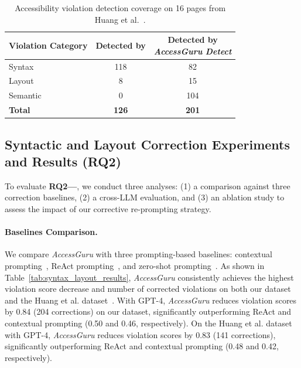 \documentclass[sigconf, nonacm]{acmart}
\newcommand{\method}{\emph{AccessGuru}}
\begin{document}

\renewcommand{\arraystretch}{1.2}
\begin{table}[h]
\centering
\caption{Accessibility violation detection coverage on 16 pages from Huang et al.~\cite{DBLP:journals/corr/abs-2401-16450}.}
\label{tab:detection_coverage}
\small
\begin{tabular}{|l|c|c|}
\hline
\textbf{Violation Category} & \makecell{\textbf{Detected by} \\ \textbf{\cite{DBLP:journals/corr/abs-2401-16450}}} & \makecell{\textbf{Detected by} \\ \textbf{\method{} \emph{Detect}}} \\
\hline
Syntax    & 118 & 82  \\
Layout    & 8   & 15  \\
Semantic  & 0   & 104 \\
\hline
\textbf{Total} & \textbf{126} & \textbf{201} \\
\hline
\end{tabular}
\renewcommand{\arraystretch}{1.0}
\end{table}

\subsection{Syntactic and Layout Correction Experiments and Results (RQ2)}

To evaluate \textbf{RQ2—}, we conduct three analyses: (1) a comparison against three correction baselines, (2) a cross-LLM evaluation, and (3) an ablation study to assess the impact of our corrective re-prompting strategy.

\paragraph{Baselines Comparison.} We compare \method{} with three prompting-based baselines: contextual prompting~\cite{DBLP:conf/petra/OthmanDJ23}, ReAct prompting~\cite{DBLP:journals/corr/abs-2401-16450}, and zero-shot prompting~\cite{DBLP:conf/ccnc/DelnevoAM24}. As shown in Table~\ref{tab:syntax_layout_results}, \method{} consistently achieves the highest violation score decrease and number of corrected violations on both our dataset and the Huang et al. dataset~\cite{DBLP:journals/corr/abs-2401-16450}. With GPT-4, \method{} reduces violation scores by 0.84 (204 corrections) on our dataset, significantly outperforming ReAct and contextual prompting (0.50 and 0.46, respectively). On the Huang et al. dataset with GPT-4, \method{} reduces violation scores by 0.83 (141 corrections), significantly outperforming ReAct and contextual prompting (0.48 and 0.42, respectively).
\end{document}
